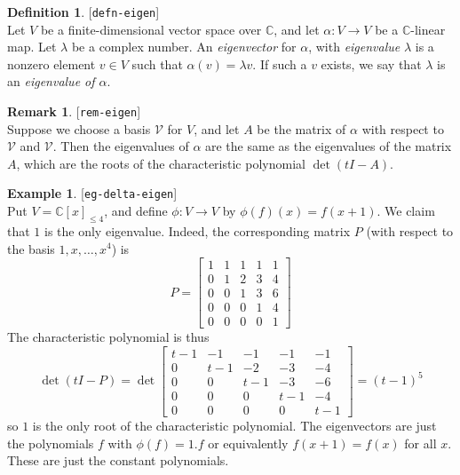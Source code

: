 \documentclass{amsart}
\newcommand{\lbl}[1]{\label{#1}\textup{[\texttt{#1}]}\ \\}
\newcommand{\lbl}{\label}
\newcommand{\C}         {{\mathbb{C}}}
\newcommand{\bsm}       {\left[\begin{smallmatrix}}
\newcommand{\esm}       {\end{smallmatrix}\right]}
\newcommand{\al}        {\alpha}
\newcommand{\lm}        {\lambda}
\newcommand{\xra}       {\xrightarrow}
\newcommand{\CV}        {{\mathcal{V}}}
\renewcommand{\:}       {\colon}
\theoremstyle{definition}
\newtheorem{remark}[theorem]{Remark}
\newtheorem{definition}[theorem]{Definition}
\newtheorem{example}[theorem]{Example}
\begin{document}
\begin{definition}\lbl{defn-eigen}
 Let $V$ be a finite-dimensional vector space over $\C$, and
 let $\al\:V\to V$ be a $\C$-linear map.  Let $\lm$ be a
 complex number.  An \emph{eigenvector} for $\al$, with
 \emph{eigenvalue} $\lm$ is a nonzero element $v\in V$ such
 that $\al(v)=\lm v$.  If such a $v$ exists, we say that
 $\lm$ is an \emph{eigenvalue of $\al$}.
\end{definition}
\begin{remark}\lbl{rem-eigen}
 Suppose we choose a basis $\CV$ for $V$, and let $A$ be the
 matrix of $\al$ with respect to $\CV$ and $\CV$.  Then the
 eigenvalues of $\al$ are the same as the eigenvalues of the
 matrix $A$, which are the roots of the characteristic
 polynomial $\det(tI-A)$.
\end{remark}

\begin{example}\lbl{eg-delta-eigen}
 Put $V=\C[x]_{\leq 4}$, and define $\phi\:V\xra{}V$ by
 $\phi(f)(x)=f(x+1)$.  We claim that
 $1$ is the only eigenvalue.  Indeed, the
 corresponding matrix $P$ (with respect to the basis
 $1,x,\dotsc,x^4$) is
 {\small \[ 
  P = \bsm 1 & 1 & 1 & 1 & 1 \\
           0 & 1 & 2 & 3 & 4 \\
           0 & 0 & 1 & 3 & 6 \\
           0 & 0 & 0 & 1 & 4 \\
           0 & 0 & 0 & 0 & 1 \esm
 \]}
 The characteristic polynomial is thus 
 {\small \[ 
  \det(tI-P) =
   \det\bsm t-1 & -1  & -1  & -1  & -1 \\
            0   & t-1 & -2  & -3  & -4 \\
            0   & 0   & t-1 & -3  & -6 \\
            0   & 0   & 0   & t-1 & -4 \\
            0   & 0   & 0   & 0   & t-1 \esm
  = (t-1)^5
 \]}
 so $1$ is the only root of the characteristic
 polynomial.  The eigenvectors are just the
  polynomials $f$ with $\phi(f)=1.f$ or equivalently
  $f(x+1)=f(x)$ for all $x$. These are just the
  constant polynomials.
\end{example}
\end{document}
